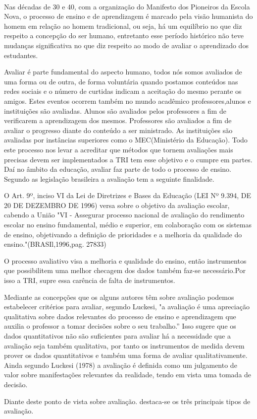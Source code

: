 	\paragraph{}
    	Nas décadas de 30 e 40, com  a organização do Manifesto dos Pioneiros da Escola Nova, o processo de ensino e de aprendizagem é marcado  pela visão humanista do homem em relação ao homem tradicional, ou seja, há um equilíbrio no que diz respeito a concepção do ser humano, entretanto esse período histórico não teve mudanças significativa no que diz respeito ao modo de avaliar o aprendizado dos estudantes. \cite{OLIVEIRA}
    \par
       Avaliar é parte fundamental do aspecto humano, todos nós somos avaliados de uma forma ou de outra, de forma voluntária quando postamos conteúdos nas redes sociais e o número de curtidas indicam a aceitação do mesmo perante os amigos. Estes eventos ocorrem também no mundo acadêmico professores,alunos e instituições são avaliadas. Alunos são avaliados pelos professores a fim de verificarem a aprendizagem dos mesmos. Professores são avaliados a fim de avaliar o progresso diante do conteúdo a ser ministrado. As instituições são avaliadas por instâncias superiores como o MEC(Ministério da Educação). Todo este processo nos levar a acreditar que métodos  que tornem avaliações mais precisas devem ser implementados a TRI tem esse objetivo e o cumpre em partes. Daí no âmbito da educação, avaliar faz parte de todo o processo de ensino. Segundo as legislação brasileira a avaliação tem a seguinte finalidade.
	\par
	    \textcite{LDB} O Art. 9º, inciso VI da Lei de Diretrizes e Bases da Educação (LEI Nº 9.394, DE 20 DE DEZEMBRO DE 1996) versa sobre o objetivo da avaliação escolar, cabendo a União
		"VI - Assegurar processo nacional de avaliação do rendimento escolar no ensino fundamental, médio e superior, em colaboração com os sistemas de ensino, objetivando a definição de prioridades e a melhoria da qualidade do ensino."(BRASIl,1996,pag. 27833)
	\par
	    O processo avaliativo visa a melhoria e qualidade do ensino, então instrumentos que possibilitem uma melhor checagem dos dados também faz-se necessário.Por isso a TRI, supre essa carência de falta de instrumentos. 
	\par
	    Mediante as concepções que os alguns autores têm sobre avaliação podemos estabelecer critérios para avaliar, segundo Luckesi, "a avaliação é uma apreciação qualitativa sobre dados relevantes do processo de ensino e aprendizagem que auxilia o professor a tomar decisões sobre o seu trabalho.” Isso sugere que os dados quantitativos não são suficientes para avaliar há a necessidade que a avaliação seja também qualitativa, por tanto os instrumentos de medida devem prover os dados quantitativos e também uma forma de avaliar qualitativamente. Ainda segundo Luckesi (1978) a avaliação é definida como um julgamento de valor sobre manifestações relevantes da realidade, tendo em vista uma tomada de decisão.
	\par
	    Diante deste ponto de vista sobre avaliação. destaca-se os três principais tipos de avaliação.
